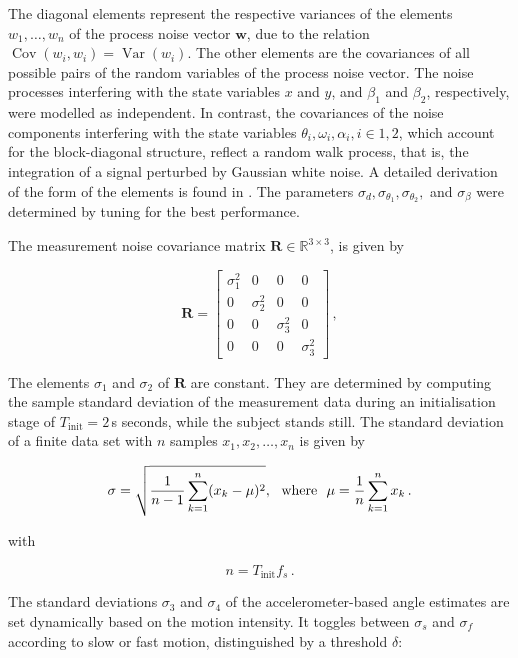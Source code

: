 \noindent
The diagonal elements represent the respective variances of the elements $w_1, \dots, w_n$ of the process noise vector $\mathbf{w}$, due to the relation $\operatorname{Cov}(w_i,w_i) = \operatorname{Var}(w_i)$. The other elements are the covariances of all possible pairs of the random variables of the process noise vector. The noise processes interfering with the state variables $x$ and $y$, and $\beta_1$ and $\beta_2$, respectively, were modelled as independent. In contrast, the covariances of the noise components interfering with the state variables $\theta_i, \omega_i, \alpha_i, i \in {1, 2}$, which account for the block-diagonal structure, reflect a random walk process, that is, the integration of a signal perturbed by Gaussian white noise. A detailed derivation of the form of the elements is found in \cite{Kelly_1994_random}. The parameters $\sigma_d, \sigma_{\theta_1}, \sigma_{\theta_2},$ and $\sigma_{\beta}$ were determined by tuning for the best performance.

The measurement noise covariance matrix $\mathbf{R} \in \mathbb{R}^{3 \times 3}$, is given by

\begin{equation}
\mathbf{R} = \begin{bmatrix}
  \sigma^2_1 & 0 & 0 & 0\\
  0 & \sigma^2_2 & 0 & 0\\
  0 & 0 & \sigma^2_3 & 0\\
  0 & 0 & 0 & \sigma^2_3
\end{bmatrix}\,,
\end{equation}

The elements $\sigma_1$ and $\sigma_2$ of $\mathbf{R}$ are constant. They are determined by computing the sample standard deviation of the measurement data during an initialisation stage of $T_{\text{init}} = 2$\,s seconds, while the subject stands still. The standard deviation of a finite data set with $n$ samples $x_1, x_2, \dots, x_n$ is given by

\begin{equation}
  \sigma = \sqrt{\frac{1}{n-1} \sum_{k=1}^n (x_k - \mu)^2}, {\rm \ \ where\ \ } \mu = \frac{1}{n} \sum_{k=1}^n x_k\,.
\end{equation}

\noindent
with

\begin{equation}
  n = T_{\text{init}} f_s\,.
\end{equation}


\noindent
The standard deviations $\sigma_3$ and $\sigma_4$ of the accelerometer-based angle estimates are set dynamically based on the motion intensity. It toggles between $\sigma_s$ and $\sigma_f$ according to slow or fast motion, distinguished by a threshold $\delta$:

